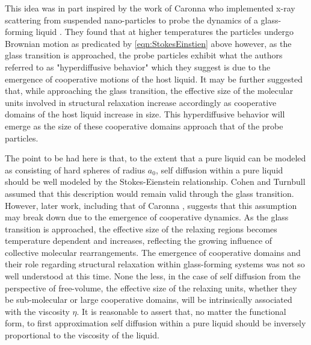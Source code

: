This idea was in part inspired by the work of Caronna \etal who implemented x-ray scattering from suspended nano-particles to probe the dynamics of a glass-forming liquid \nolinebreak\cite{Caronna}.  They found that at higher temperatures the particles undergo Brownian motion as predicated by \eqn\nolinebreak \ref{eqn:StokesEinstien} above however, as the glass transition is approached, the probe particles exhibit what the authors referred to as "hyperdiffusive behavior" which they suggest is due to the emergence of cooperative motions of the host liquid.  It may be further suggested that, while approaching the glass transition, the effective size of the molecular units involved in structural relaxation increase accordingly as cooperative domains of the host liquid increase in size.  This hyperdiffusive behavior will emerge as the size of these cooperative domains approach that of the probe particles.

The point to be had here is that, to the extent that a pure liquid can be modeled as consisting of hard spheres of radius $a_0$, self diffusion within a pure liquid should be well modeled by the Stokes-Eienstein relationship.  Cohen and Turnbull assumed that this description would remain valid through the glass transition. However, later work, including that of Caronna \etal, suggests that this assumption may break down due to the emergence of cooperative dynamics. As the glass transition is approached, the effective size of the relaxing regions becomes temperature dependent and increases, reflecting the growing influence of collective molecular rearrangements. The emergence of cooperative domains and their role regarding structural relaxation within glass-forming systems was not so well understood at this time.  None the less, in the case of self diffusion from the perspective of free-volume, the effective size of the relaxing units, whether they be sub-molecular or large cooperative domains, will be intrinsically associated with the viscosity $\eta$. It is reasonable to assert that, no matter the functional form, to first approximation self diffusion within a pure liquid should be inversely proportional to the viscosity of the liquid.  

